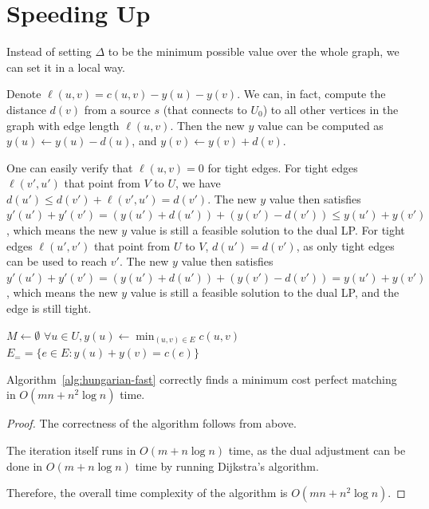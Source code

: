 \section{Speeding Up}

Instead of setting $\Delta$ to be the minimum possible value over the whole graph, we can set it in a local way.

Denote $\ell(u,v) = c(u,v) - y(u) - y(v)$. We can, in fact, compute the distance $d(v)$ from a source $s$ (that connects to $U_0$) to all other vertices in the graph with edge length $\ell(u,v)$.
Then the new $y$ value can be computed as $y(u) \gets y(u) - d(u)$, and $y(v) \gets y(v) + d(v)$.

One can easily verify that $\ell(u,v) = 0$ for tight edges.
For tight edges $\ell(v',u')$ that point from $V$ to $U$, we have $d(u')\leq d(v') + \ell(v',u') = d(v')$. The new $y$ value then satisfies $y'(u') + y'(v') = (y(u') + d(u')) + (y(v') - d(v')) \leq y(u') + y(v')$, which means the new $y$ value is still a feasible solution to the dual LP.
For tight edges $\ell(u',v')$ that point from $U$ to $V$, $d(u') = d(v')$, as only tight edges can be used to reach $v'$. The new $y$ value then satisfies $y'(u') + y'(v') = (y(u') + d(u')) + (y(v') - d(v')) = y(u') + y(v')$, which means the new $y$ value is still a feasible solution to the dual LP, and the edge is still tight.

\begin{algorithm}[H]
	\caption{Faster Hungarian Algorithm} \label{alg:hungarian-fast}
	$M \gets \emptyset$\;
	$\forall u \in U, y(u) \gets \min_{(u,v)\in E} c(u,v)$\;
	$E_= = \{ e \in E : y(u) + y(v) = c(e) \}$\;
\end{algorithm}
\begin{theorem}
	Algorithm~\ref{alg:hungarian-fast} correctly finds a minimum cost perfect matching in \( O(mn + n^2\log n) \) time.
\end{theorem}
\begin{proof}
	The correctness of the algorithm follows from above.

	The iteration itself runs in \( O(m + n \log n) \) time, as the dual adjustment can be done in \( O(m + n \log n) \) time by running Dijkstra's algorithm.

	Therefore, the overall time complexity of the algorithm is \( O(mn + n^2\log n) \).
\end{proof}

